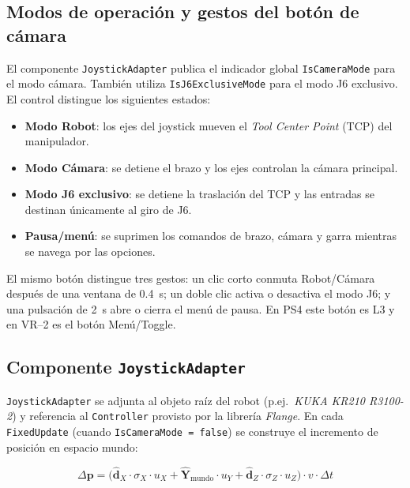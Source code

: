 \subsection{Modos de operación y gestos del botón de cámara}

El componente \texttt{JoystickAdapter} publica el indicador global
\texttt{IsCameraMode} para el modo cámara. También utiliza
\texttt{IsJ6ExclusiveMode} para el modo J6 exclusivo. El control distingue los
siguientes estados:

\begin{itemize}
    \item \textbf{Modo Robot}: los ejes del joystick mueven el
          \emph{Tool Center Point} (TCP) del manipulador.
    \item \textbf{Modo Cámara}: se detiene el brazo y los ejes controlan la
          cámara principal.
    \item \textbf{Modo J6 exclusivo}: se detiene la traslación del TCP y las
          entradas se destinan únicamente al giro de J6.
    \item \textbf{Pausa/menú}: se suprimen los comandos de brazo, cámara y garra
          mientras se navega por las opciones.
\end{itemize}

El mismo botón distingue tres gestos: un clic corto conmuta Robot/Cámara después
de una ventana de \SI{0.4}{\second}; un doble clic activa o desactiva el modo J6;
y una pulsación de \SI{2}{\second} abre o cierra el menú de pausa. En PS4 este
botón es L3 y en VR--2 es el botón Menú/Toggle.

\subsection{Componente \texttt{JoystickAdapter}}

\texttt{JoystickAdapter} se adjunta al objeto raíz del robot (p.ej.\ \emph{KUKA
KR210 R3100-2}) y referencia al \texttt{Controller} provisto por la librería
\emph{Flange}. En cada \texttt{FixedUpdate} (cuando \texttt{IsCameraMode = false})
se construye el incremento de posición en espacio mundo:

\begin{equation}
    \Delta\mathbf{p} = \bigl(\hat{\mathbf{d}}_X \cdot \sigma_X \cdot u_X
                           + \hat{\mathbf{Y}}_{\text{mundo}} \cdot u_Y
                           + \hat{\mathbf{d}}_Z \cdot \sigma_Z \cdot u_Z\bigr)
                       \cdot v \cdot \Delta t
    \label{eq:delta_p}
\end{equation}

